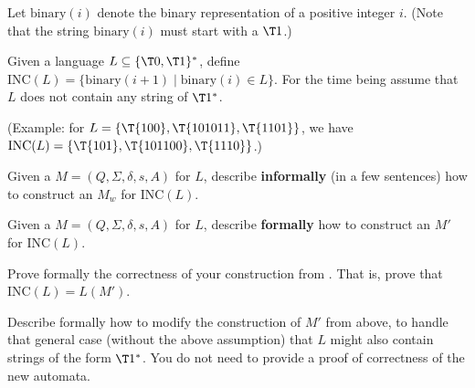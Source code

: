 \begin{questions}[start=7]
    
    \bigskip%
    \item {}%
    {%
       \newcommand{\INC}{\mathrm{INC}}%
       \newcommand{\binary}{\textrm{binary}}%
       Let $\binary(i)$ denote the binary representation of a positive
       integer $i$.  (Note that the string $\binary(i)$ must start
       with a $\T1$.)
       
       Given a language $L\subseteq \{\T0,\T1\}^*$, define
       $\INC(L)=\{\binary(i+1) \mid \binary(i)\in L\}$. For the time
       being assume that $L$ does not contain any string of $\T1^*$.
       
       (Example: for $L=\{\T{100},\T{101011},\T{1101} \}$, we have
       $\INC(L)=\{\T{101},\T{101100},\T{1110} \}$.)
       
       \begin{questions}
           \item {} Given a \DFA
           $M = (Q, \Sigma, \delta, s, A)$ for $L$, describe
           \textbf{informally} (in a few sentences) how to construct
           an \NFA $M_w$ for $\INC(L)$.
           
           
           \item {}  Given a \DFA
           $M = (Q, \Sigma, \delta, s, A)$ for $L$, describe
           \textbf{formally} how to construct an \NFA $M'$ for
           $\INC(L)$.
           
           
           
           \item {} Prove formally the correctness of your
           construction from . That is, prove that
           $\INC(L) = L(M')$.
           
           \item {} Describe formally how to modify the
           construction of $M'$ from above, to handle that general
           case (without the above assumption) that $L$ might also
           contain strings of the form $\T1^*$. You do not need to
           provide a proof of correctness of the new automata.
       \end{questions}
    }{}{}

\end{questions}



